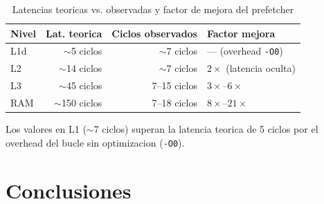 \documentclass[12pt,a4paper]{article}
\begin{document}
\begin{table}[H]
\centering
\caption{Latencias teoricas vs. observadas y factor de mejora del prefetcher}
\label{tab:latencias}
\begin{tabular}{lrrl}
\toprule
\textbf{Nivel} & \textbf{Lat. teorica} & \textbf{Ciclos observados} & \textbf{Factor mejora} \\
\midrule
L1d  & $\sim$5 ciclos   & $\sim$7 ciclos   & --- (overhead \texttt{-O0}) \\
L2   & $\sim$14 ciclos  & $\sim$7 ciclos   & $2\times$ (latencia oculta) \\
L3   & $\sim$45 ciclos  & 7--15 ciclos     & $3\times$--$6\times$ \\
RAM  & $\sim$150 ciclos & 7--18 ciclos     & $8\times$--$21\times$ \\
\bottomrule
\end{tabular}
\end{table}

Los valores en L1 ($\sim$7 ciclos) superan la latencia teorica de 5 ciclos por el overhead del bucle sin optimizacion (\texttt{-O0}).

\section{Conclusiones}
\end{document}
